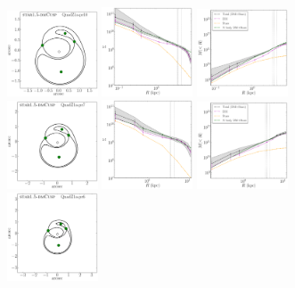 \documentclass[galley,usenatbib]{mn2e}
\begin{document}
\begin{figure}
\includegraphics[width=0.24\textwidth]{BCQuadR1a-pr10_TmS-a.pdf}
\includegraphics[width=0.24\textwidth]{BCQuadR1a-pr10_TmS-b.pdf}
\includegraphics[width=0.24\textwidth]{BCQuadR1a-pr10_TmS-c.pdf}\\
%
\includegraphics[width=0.24\textwidth]{BCQuadR1a-pr7_TmS-a.pdf}
\includegraphics[width=0.24\textwidth]{BCQuadR1a-pr7_TmS-b.pdf}
\includegraphics[width=0.24\textwidth]{BCQuadR1a-pr7_TmS-c.pdf}\\
%
\includegraphics[width=0.24\textwidth]{BCQuadR1a-pr6_TmS-a.pdf}

\end{figure}
\end{document}
